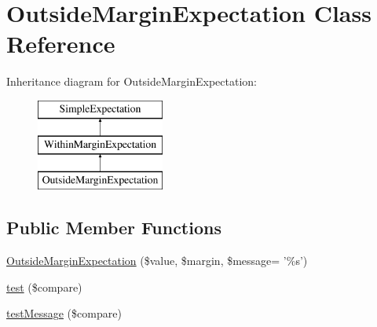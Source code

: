 \hypertarget{class_outside_margin_expectation}{
\section{OutsideMarginExpectation Class Reference}
\label{class_outside_margin_expectation}
}
Inheritance diagram for OutsideMarginExpectation:\begin{figure}[H]
\begin{center}
\leavevmode
\includegraphics[height=3.000000cm]{class_outside_margin_expectation}
\end{center}
\end{figure}
\subsection*{Public Member Functions}
\begin{DoxyCompactItemize}
\item 
\hyperlink{class_outside_margin_expectation_a1413a72a816e6d5b0bbcc0895cbe6f12}{OutsideMarginExpectation} (\$value, \$margin, \$message= '\%s')
\item 
\hyperlink{class_outside_margin_expectation_a6c68e08230af88b7cf33445bbc2ff24f}{test} (\$compare)
\item 
\hyperlink{class_outside_margin_expectation_a62179c3675f6db8e4e41d7fffc32acfd}{testMessage} (\$compare)
\end{DoxyCompactItemize}



